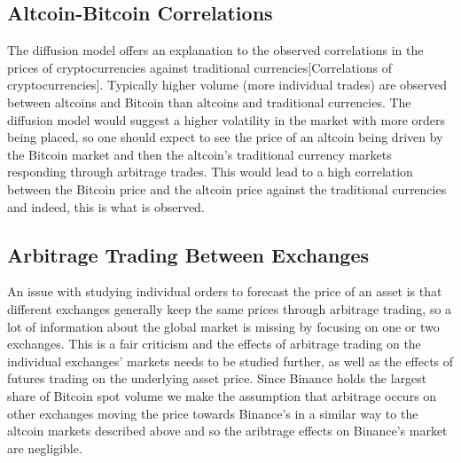 \documentclass[a4paper,10pt]{article}
\begin{document}
\subsection{Altcoin-Bitcoin Correlations}
The diffusion model offers an explanation to the observed correlations in the prices of cryptocurrencies against traditional currencies[Correlations of cryptocurrencies]. Typically higher volume (more individual trades) are observed between altcoins and Bitcoin than altcoins and traditional currencies. The diffusion model would suggest a higher volatility in the market with more orders being placed, so one should expect to see the price of an altcoin being driven by the Bitcoin market and then the altcoin's traditional currency markets responding through arbitrage trades. This would lead to a high correlation between the Bitcoin price and the altcoin price against the traditional currencies and indeed, this is what is observed.
\subsection{Arbitrage Trading Between Exchanges}
An issue with studying individual orders to forecast the price of an asset is that different exchanges generally keep the same prices through arbitrage trading, so a lot of information about the global market is missing by focusing on one or two exchanges. This is a fair criticism and the effects of arbitrage trading on the individual exchanges' markets needs to be studied further, as well as the effects of futures trading on the underlying asset price. Since Binance holds the largest share of Bitcoin spot volume we make the assumption that arbitrage occurs on other exchanges moving the price towards Binance's in a similar way to the altcoin markets described above and so the aribtrage effects on Binance's market are negligible.

\medskip
\printbibliography
\end{document}
